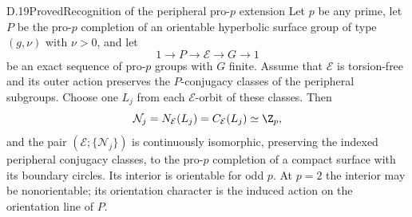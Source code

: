 \begin{claim}{D.19}{Proved}{Recognition of the peripheral pro-$p$ extension}
Let $p$ be any prime, let $P$ be the pro-$p$ completion of an orientable hyperbolic surface group of type $(g,\nu)$ with $\nu>0$, and let
\[
 1\longrightarrow P\longrightarrow\mathcal E\longrightarrow G\longrightarrow1
\]
be an exact sequence of pro-$p$ groups with $G$ finite. Assume that $\mathcal E$ is torsion-free and its outer action preserves the $P$-conjugacy classes of the peripheral subgroups. Choose one $L_j$ from each $\mathcal E$-orbit of these classes. Then
\[
 \mathcal N_j=N_{\mathcal E}(L_j)=C_{\mathcal E}(L_j)\simeq\Z_p,
\]
and the pair $(\mathcal E;\{\mathcal N_j\})$ is continuously isomorphic, preserving the indexed peripheral conjugacy classes, to the pro-$p$ completion of a compact surface with its boundary circles. Its interior is orientable for odd $p$. At $p=2$ the interior may be nonorientable; its orientation character is the induced action on the orientation line of $P$.
\end{claim}
